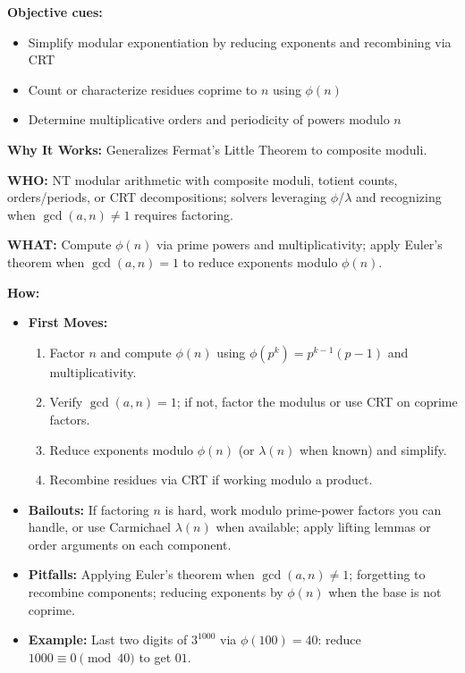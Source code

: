 \documentclass[12pt]{article}
\begin{document}
\textbf{Objective cues:}
\begin{itemize}
    \item Simplify modular exponentiation by reducing exponents and recombining via CRT
    \item Count or characterize residues coprime to $n$ using $\phi(n)$
    \item Determine multiplicative orders and periodicity of powers modulo $n$
\end{itemize}

\textbf{Why It Works:} Generalizes Fermat's Little Theorem to composite moduli.

\textbf{WHO:} NT modular arithmetic with composite moduli, totient counts, orders/periods, or CRT decompositions; solvers leveraging $\phi$/$\lambda$ and recognizing when $\gcd(a,n)\ne1$ requires factoring.

\textbf{WHAT:} Compute $\phi(n)$ via prime powers and multiplicativity; apply Euler's theorem when $\gcd(a,n)=1$ to reduce exponents modulo $\phi(n)$.


\textbf{How:}
\begin{itemize}
    \item \textbf{First Moves:}
    \begin{enumerate}[nosep]
        \item Factor $n$ and compute $\phi(n)$ using $\phi(p^k)=p^{k-1}(p-1)$ and multiplicativity.
        \item Verify $\gcd(a,n)=1$; if not, factor the modulus or use CRT on coprime factors.
        \item Reduce exponents modulo $\phi(n)$ (or $\lambda(n)$ when known) and simplify.
        \item Recombine residues via CRT if working modulo a product.
    \end{enumerate}
    \item \textbf{Bailouts:} If factoring $n$ is hard, work modulo prime-power factors you can handle, or use Carmichael $\lambda(n)$ when available; apply lifting lemmas or order arguments on each component.
    \item \textbf{Pitfalls:} Applying Euler's theorem when $\gcd(a,n)\ne1$; forgetting to recombine components; reducing exponents by $\phi(n)$ when the base is not coprime.
    \item \textbf{Example:} Last two digits of $3^{1000}$ via $\phi(100)=40$: reduce $1000\equiv0\pmod{40}$ to get $01$.
\end{itemize}
\end{document}
